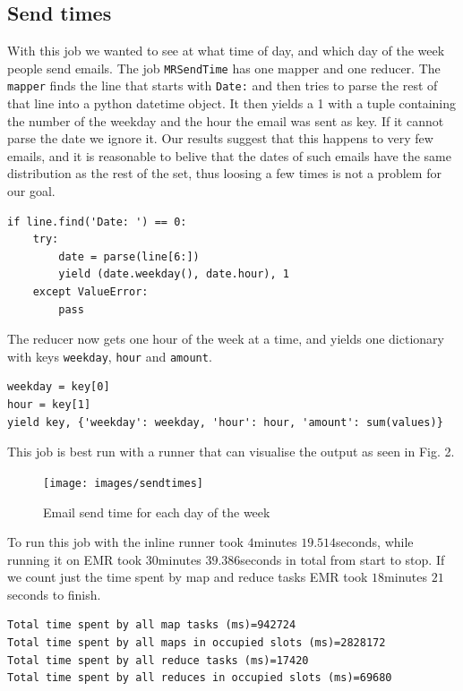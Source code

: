 \documentclass[runningheads,a4paper]{llncs}
\begin{document}
\subsection{Send times}
\label{sec:sendtimes}
With this job we wanted to see at what time of day, and which day of the week people send emails.
\newline
The job \verb!MRSendTime! has one mapper and one reducer. The \verb!mapper! finds the line that starts with \verb!Date:! and then tries to parse the rest of that line into a python datetime object. It then yields a 1 with a tuple containing the number of the weekday and the hour the email was sent as key. If it cannot parse the date we ignore it. Our results suggest that this happens to very few emails, and it is reasonable to belive that the dates of such emails have the same distribution as the rest of the set, thus loosing a few times is not a problem for our goal.

\begin{verbatim}
if line.find('Date: ') == 0:
    try:
        date = parse(line[6:])
        yield (date.weekday(), date.hour), 1
    except ValueError:
        pass
\end{verbatim}
The reducer now gets one hour of the week at a time, and yields one dictionary with keys \verb!weekday!, \verb!hour! and \verb!amount!.  
\begin{verbatim}
weekday = key[0]
hour = key[1]
yield key, {'weekday': weekday, 'hour': hour, 'amount': sum(values)}
\end{verbatim}
This job is best run with a runner that can visualise the output as seen in Fig. 2.

\begin{figure}[h]
	\begin{center}
		\texttt{[image: images/sendtimes]}
	\end{center}
	\caption{Email send time for each day of the week}
\end{figure}
To run this job with the inline runner took $4$minutes $19.514$seconds, while running it on EMR took $30$minutes $39.386$seconds in total from start to stop. If we count just the time spent by map and reduce tasks EMR took $18$minutes $21$seconds to finish.
\begin{verbatim}
Total time spent by all map tasks (ms)=942724
Total time spent by all maps in occupied slots (ms)=2828172
Total time spent by all reduce tasks (ms)=17420
Total time spent by all reduces in occupied slots (ms)=69680
\end{verbatim}
\end{document}
